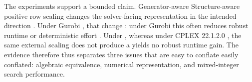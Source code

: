 \documentclass[AMA,Times1COL]{WileyNJDv5} %
\providecommand{\DIFadd}[1]{{\protect\color{blue} \sf #1}} %
\providecommand{\DIFdel}[1]{{\protect\color{red} \scriptsize #1}} %
\providecommand{\DIFaddbegin}{} %
\providecommand{\DIFaddend}{} %
\providecommand{\DIFdelbegin}{} %
\providecommand{\DIFdelend}{} %
\begin{document}
The experiments support a bounded claim. \DIFdelbegin \DIFdel{Generator-aware }\DIFdelend \DIFaddbegin \DIFadd{Structure-aware }\DIFaddend positive row scaling changes the
solver-facing representation in the intended direction\DIFdelbegin \DIFdel{. Under Gurobi , that change }\DIFdelend \DIFaddbegin \DIFadd{: under Gurobi this }\DIFaddend often reduces
robust runtime or deterministic effort\DIFdelbegin \DIFdel{. Under }\DIFdelend \DIFaddbegin \DIFadd{, whereas under }\DIFaddend CPLEX 22.1.2.0 \DIFdelbegin \DIFdel{, }\DIFdelend the same external
scaling \DIFdelbegin \DIFdel{does not produce a }\DIFdelend \DIFaddbegin \DIFadd{yields no }\DIFaddend robust runtime gain. The evidence \DIFdelbegin \DIFdel{therefore }\DIFdelend \DIFaddbegin \DIFadd{thus }\DIFaddend separates three issues that are
\DIFdelbegin \DIFdel{easy to conflate}\DIFdelend \DIFaddbegin \DIFadd{easily conflated}\DIFaddend : algebraic equivalence, numerical representation, and mixed-integer search
performance.
\end{document}
